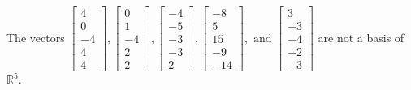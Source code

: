 \begin{exercise}
\begin{exerciseStatement}
  \end{exerciseStatement}
  \begin{exerciseAnswer}
   The vectors \(\left[\begin{array}{r}
4 \\
0 \\
-4 \\
4 \\
4
\end{array}\right] , \left[\begin{array}{r}
0 \\
1 \\
-4 \\
2 \\
2
\end{array}\right] , \left[\begin{array}{r}
-4 \\
-5 \\
-3 \\
-3 \\
2
\end{array}\right] , \left[\begin{array}{r}
-8 \\
5 \\
15 \\
-9 \\
-14
\end{array}\right] , \text{ and } \left[\begin{array}{r}
3 \\
-3 \\
-4 \\
-2 \\
-3
\end{array}\right]\) 
  	 are not  a basis of \(\mathbb{R}^5\).
  


  \end{exerciseAnswer}
\end{exercise}